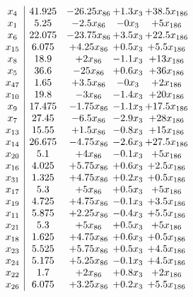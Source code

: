 \documentclass[11pt]{article}
\begin{document}
\[\begin{array}{c| c c@{\hskip 2pt} c@{\hskip 2pt} c@{\hskip 2pt} }
 x_{4}   &  41.925 & -26.25 x_{86} & + 1.3 x_{3} & + 38.5 x_{186}\\
 x_{1}   &  5.25 & -2.5 x_{86} & -0 x_{3} & + 5 x_{186}\\
 x_{6}   &  22.075 & -23.75 x_{86} & + 3.5 x_{3} & + 22.5 x_{186}\\
 x_{15}   &  6.075 & + 4.25 x_{86} & + 0.5 x_{3} & + 5.5 x_{186}\\
 x_{8}   &  18.9 & + 2 x_{86} & -1.1 x_{3} & + 13 x_{186}\\
 x_{5}   &  36.6 & -25 x_{86} & + 0.6 x_{3} & + 36 x_{186}\\
 x_{47}   &  1.65 & + 3.5 x_{86} & -0 x_{3} & + 2 x_{186}\\
 x_{10}   &  19.8 & -3 x_{86} & -1.4 x_{3} & + 20 x_{186}\\
 x_{9}   &  17.475 & -1.75 x_{86} & -1.1 x_{3} & + 17.5 x_{186}\\
 x_{7}   &  27.45 & -6.5 x_{86} & -2.9 x_{3} & + 28 x_{186}\\
 x_{13}   &  15.55 & + 1.5 x_{86} & -0.8 x_{3} & + 15 x_{186}\\
 x_{14}   &  26.675 & -4.75 x_{86} & -2.6 x_{3} & + 27.5 x_{186}\\
 x_{20}   &  5.1 & + 4 x_{86} & -0.1 x_{3} & + 5 x_{186}\\
 x_{16}   &  4.025 & + 5.75 x_{86} & + 0.6 x_{3} & + 2.5 x_{186}\\
 x_{31}   &  1.325 & + 4.75 x_{86} & + 0.2 x_{3} & + 0.5 x_{186}\\
 x_{17}   &  5.3 & + 5 x_{86} & + 0.5 x_{3} & + 5 x_{186}\\
 x_{19}   &  4.725 & + 4.75 x_{86} & -0.1 x_{3} & + 3.5 x_{186}\\
 x_{11}   &  5.875 & + 2.25 x_{86} & -0.4 x_{3} & + 5.5 x_{186}\\
 x_{21}   &  5.3 & + 5 x_{86} & + 0.5 x_{3} & + 5 x_{186}\\
 x_{18}   &  1.625 & + 4.75 x_{86} & + 0.6 x_{3} & + 0.5 x_{186}\\
 x_{23}   &  5.525 & + 5.75 x_{86} & + 0.5 x_{3} & + 4.5 x_{186}\\
 x_{24}   &  5.175 & + 5.25 x_{86} & -0.1 x_{3} & + 4.5 x_{186}\\
 x_{22}   &  1.7 & + 2 x_{86} & + 0.8 x_{3} & + 2 x_{186}\\
 x_{26}   &  6.075 & + 3.25 x_{86} & + 0.2 x_{3} & + 5.5 x_{186}\\

\end{array}\]
\end{document}
